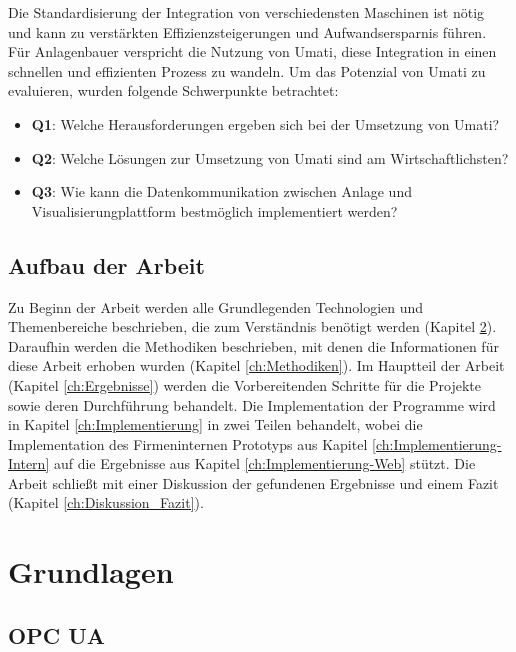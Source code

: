 \documentclass[a4paper, 12pt, oneside, toc=listofnumbered, bibliography=totoc]{scrbook}
\begin{document}
	Die Standardisierung der Integration von verschiedensten Maschinen ist nötig und kann zu verstärkten Effizienzsteigerungen und Aufwandsersparnis führen. Für Anlagenbauer verspricht die Nutzung von \ac{Umati}, diese Integration in einen schnellen und effizienten Prozess zu wandeln. Um das Potenzial von \ac{Umati} zu evaluieren, wurden folgende Schwerpunkte betrachtet:
	
	\begin{itemize}
		\item \textbf{Q1}: Welche Herausforderungen ergeben sich bei der Umsetzung von \ac{Umati}?
		\item \textbf{Q2}: Welche Lösungen zur Umsetzung von \ac{Umati} sind am Wirtschaftlichsten?
		\item \textbf{Q3}: Wie kann die Datenkommunikation zwischen Anlage und Visualisierungplattform bestmöglich implementiert werden?
	\end{itemize}
	
	\section{Aufbau der Arbeit}
	
	Zu Beginn der Arbeit werden alle Grundlegenden Technologien und Themenbereiche beschrieben, die zum Verständnis benötigt werden (Kapitel \ref{ch:Grundlagen}). Daraufhin werden die Methodiken beschrieben, mit denen die Informationen für diese Arbeit erhoben wurden (Kapitel \ref{ch:Methodiken}). Im Hauptteil der Arbeit (Kapitel \ref{ch:Ergebnisse}) werden die Vorbereitenden Schritte für die Projekte sowie deren Durchführung behandelt. Die Implementation der Programme wird in Kapitel \ref{ch:Implementierung} in zwei Teilen behandelt, wobei die Implementation des Firmeninternen Prototyps aus Kapitel \ref{ch:Implementierung-Intern} auf die Ergebnisse aus Kapitel \ref{ch:Implementierung-Web} stützt. Die Arbeit schließt mit einer Diskussion der gefundenen Ergebnisse und einem Fazit (Kapitel \ref{ch:Diskussion_Fazit}).
	
	
\chapter{Grundlagen}\label{ch:Grundlagen}
	
	
	
	\section{OPC UA}
	
\end{document}
